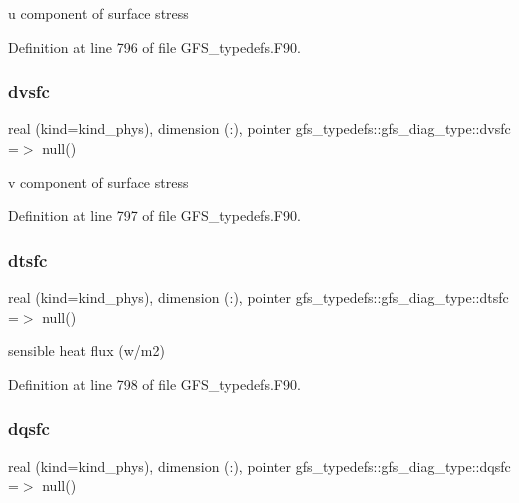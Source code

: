 u component of surface stress 



Definition at line 796 of file G\+F\+S\+\_\+typedefs.\+F90.

\mbox{\label{structgfs__typedefs_1_1gfs__diag__type_a0bd90d3df9d2289c6c8b51feb0f87b8e}} 
\subsubsection{dvsfc}
{\footnotesize\ttfamily real (kind=kind\+\_\+phys), dimension  (\+:), pointer gfs\+\_\+typedefs\+::gfs\+\_\+diag\+\_\+type\+::dvsfc =$>$ null()}



v component of surface stress 



Definition at line 797 of file G\+F\+S\+\_\+typedefs.\+F90.

\mbox{\label{structgfs__typedefs_1_1gfs__diag__type_a0d1b4c62d5cc389feed9c8cabf40f5d8}} 
\subsubsection{dtsfc}
{\footnotesize\ttfamily real (kind=kind\+\_\+phys), dimension  (\+:), pointer gfs\+\_\+typedefs\+::gfs\+\_\+diag\+\_\+type\+::dtsfc =$>$ null()}



sensible heat flux (w/m2) 



Definition at line 798 of file G\+F\+S\+\_\+typedefs.\+F90.

\mbox{\label{structgfs__typedefs_1_1gfs__diag__type_a70005f2143fc23d850a62e5eef5784b4}} 
\subsubsection{dqsfc}
{\footnotesize\ttfamily real (kind=kind\+\_\+phys), dimension  (\+:), pointer gfs\+\_\+typedefs\+::gfs\+\_\+diag\+\_\+type\+::dqsfc =$>$ null()}



